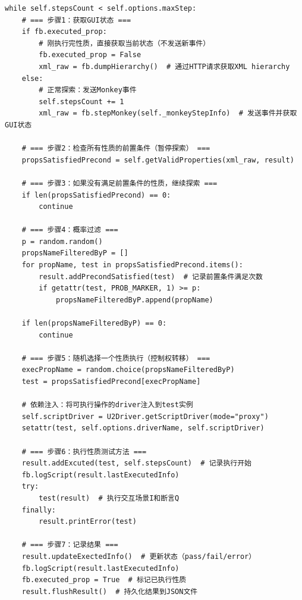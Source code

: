 \documentclass[a4paper, zihao=-4]{ctexart}
\begin{document}
\begin{lstlisting}[label=code:main_loop_full, caption=完整探索控制流]
while self.stepsCount < self.options.maxStep:
    # === 步骤1：获取GUI状态 ===
    if fb.executed_prop:
        # 刚执行完性质，直接获取当前状态（不发送新事件）
        fb.executed_prop = False
        xml_raw = fb.dumpHierarchy()  # 通过HTTP请求获取XML hierarchy
    else:
        # 正常探索：发送Monkey事件
        self.stepsCount += 1
        xml_raw = fb.stepMonkey(self._monkeyStepInfo)  # 发送事件并获取GUI状态
    
    # === 步骤2：检查所有性质的前置条件（暂停探索） ===
    propsSatisfiedPrecond = self.getValidProperties(xml_raw, result)
    
    # === 步骤3：如果没有满足前置条件的性质，继续探索 ===
    if len(propsSatisfiedPrecond) == 0:
        continue
    
    # === 步骤4：概率过滤 ===
    p = random.random()
    propsNameFilteredByP = []
    for propName, test in propsSatisfiedPrecond.items():
        result.addPrecondSatisfied(test)  # 记录前置条件满足次数
        if getattr(test, PROB_MARKER, 1) >= p:
            propsNameFilteredByP.append(propName)
    
    if len(propsNameFilteredByP) == 0:
        continue
    
    # === 步骤5：随机选择一个性质执行（控制权转移） ===
    execPropName = random.choice(propsNameFilteredByP)
    test = propsSatisfiedPrecond[execPropName]
    
    # 依赖注入：将可执行操作的driver注入到test实例
    self.scriptDriver = U2Driver.getScriptDriver(mode="proxy")
    setattr(test, self.options.driverName, self.scriptDriver)
    
    # === 步骤6：执行性质测试方法 ===
    result.addExcuted(test, self.stepsCount)  # 记录执行开始
    fb.logScript(result.lastExecutedInfo)
    try:
        test(result)  # 执行交互场景I和断言Q
    finally:
        result.printError(test)
    
    # === 步骤7：记录结果 ===
    result.updateExectedInfo()  # 更新状态（pass/fail/error）
    fb.logScript(result.lastExecutedInfo)
    fb.executed_prop = True  # 标记已执行性质
    result.flushResult()  # 持久化结果到JSON文件
\end{lstlisting}
\end{document}
